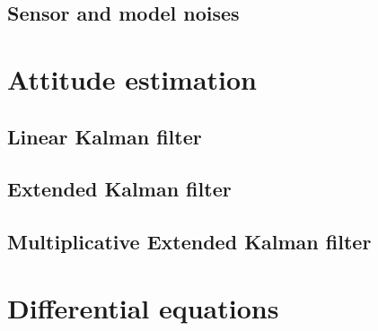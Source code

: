 \documentclass{article}
\begin{document}
\subsection{Sensor and model noises}

\section{Attitude estimation}
\subsection{Linear Kalman filter}
\subsection{Extended Kalman filter}
\subsection{Multiplicative Extended Kalman filter}

\newpage
\appendix
\section{Differential equations}
\end{document}
